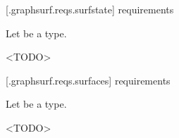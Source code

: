  [\iotwod.graphsurf.reqs.surfstate]{ requirements}

\pnum
Let  be a \graphicssurfacestemplparam type.

\pnum
<TODO>


 [\iotwod.graphsurf.reqs.surfaces]{ requirements}

\pnum
Let  be a \graphicssurfacestemplparam type.

\pnum
<TODO>

%
